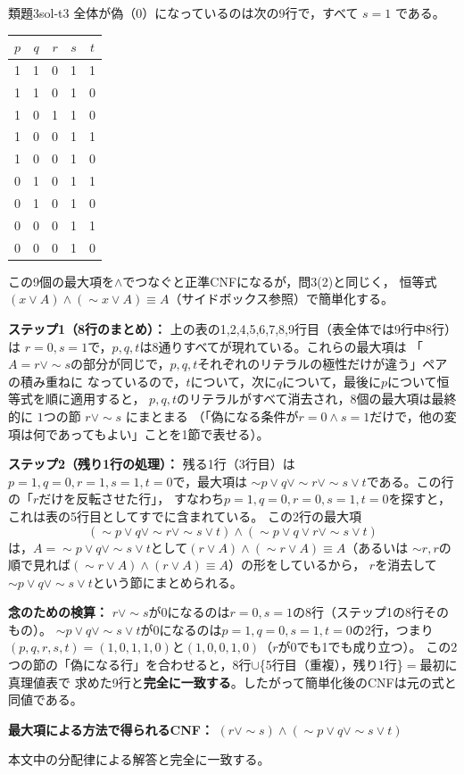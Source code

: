 \documentclass[autodetect-engine,dvi=dvipdfmx,ja=standard]{bxjsarticle}
\begin{document}
\begin{solution}{類題3}{sol-t3}
全体が偽（\(0\)）になっているのは次の9行で，すべて \(s=1\) である。

\begin{center}
\scriptsize
\begin{tabular}{ccccc}
\toprule
\(p\) & \(q\) & \(r\) & \(s\) & \(t\) \\
\midrule
1&1&0&1&1\\
1&1&0&1&0\\
1&0&1&1&0\\
1&0&0&1&1\\
1&0&0&1&0\\
0&1&0&1&1\\
0&1&0&1&0\\
0&0&0&1&1\\
0&0&0&1&0\\
\bottomrule
\end{tabular}
\end{center}
この9個の最大項を\(\land\)でつなぐと正準CNFになるが，問3(2)と同じく，
恒等式 \((x\lor A)\land(\sim x\lor A)\equiv A\)（サイドボックス参照）で簡単化する。

\textbf{ステップ1（8行のまとめ）：} 上の表の1,2,4,5,6,7,8,9行目（表全体では9行中8行）は
\(r=0,s=1\)で，\(p,q,t\)は8通りすべてが現れている。これらの最大項は
「\(A=r\lor\sim s\)の部分が同じで，\(p,q,t\)それぞれのリテラルの極性だけが違う」ペアの積み重ねに
なっているので，\(t\)について，次に\(q\)について，最後に\(p\)について恒等式を順に適用すると，
\(p,q,t\)のリテラルがすべて消去され，8個の最大項は最終的に \(1\)つの節 \(r\lor\sim s\) にまとまる
（「偽になる条件が\(r=0\land s=1\)だけで，他の変項は何であってもよい」ことを1節で表せる）。

\textbf{ステップ2（残り1行の処理）：} 残る1行（3行目）は\(p=1,q=0,r=1,s=1,t=0\)で，最大項は
\(\sim p\lor q\lor\sim r\lor\sim s\lor t\)である。この行の「\(r\)だけを反転させた行」，
すなわち\(p=1,q=0,r=0,s=1,t=0\)を探すと，これは表の5行目としてすでに含まれている。
この2行の最大項
\[
  (\sim p\lor q\lor\sim r\lor\sim s\lor t)\land(\sim p\lor q\lor r\lor\sim s\lor t)
\]
は，\(A=\sim p\lor q\lor\sim s\lor t\)として\((r\lor A)\land(\sim r\lor A)\equiv A\)（あるいは
\(\sim r,r\)の順で見れば\((\sim r\lor A)\land(r\lor A)\equiv A\)）の形をしているから，
\(r\)を消去して\(\sim p\lor q\lor\sim s\lor t\)という節にまとめられる。

\textbf{念のための検算：} \(r\lor\sim s\)が\(0\)になるのは\(r=0,s=1\)の8行（ステップ1の8行そのもの）。
\(\sim p\lor q\lor\sim s\lor t\)が\(0\)になるのは\(p=1,q=0,s=1,t=0\)の2行，つまり
\((p,q,r,s,t)=(1,0,1,1,0)\)と\((1,0,0,1,0)\)（\(r\)が0でも1でも成り立つ）。
この2つの節の「偽になる行」を合わせると，8行\(\cup\)\{5行目（重複），残り1行\}\(=\)最初に真理値表で
求めた9行と\textbf{完全に一致する}。したがって簡単化後のCNFは元の式と同値である。

\textbf{最大項による方法で得られるCNF：} \((r\lor\sim s)\land(\sim p\lor q\lor\sim s\lor t)\)

本文中の分配律による解答と完全に一致する。
\end{solution}
\end{document}
